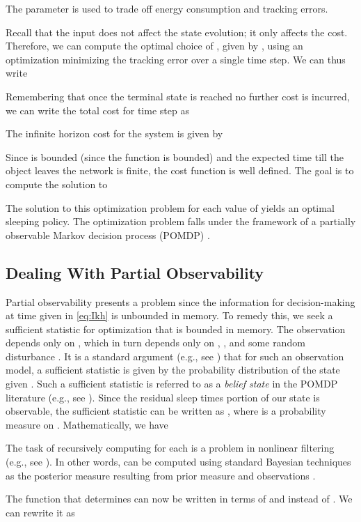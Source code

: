 \documentclass[journal,draftcls,onecolumn,11pt]{IEEEtran}
\begin{document}
The parameter  is used to trade off energy consumption and tracking errors.

Recall that the input  does not affect the state evolution; it only affects the cost. Therefore, we can compute the optimal choice of , given by , using an optimization minimizing the tracking error over a single time step.  We can thus write


Remembering that once the terminal state is reached no further cost is incurred, we can write the total cost for time step  as

The infinite horizon cost for the system is given by

Since  is bounded (since the function  is bounded) and the expected time till the object leaves the network is finite, the cost function  is well defined.  The goal is to compute the solution to

The solution to this optimization problem for each value of  yields an optimal sleeping policy.  The optimization problem falls under the framework of a partially observable Markov decision process (POMDP) \cite{aberdeen03,littman95,monahan,Hauskrecht2000}.

\subsection{Dealing With Partial Observability}
Partial observability presents a problem since the information for decision-making at time  given in \eqref{eq:Ikh} is unbounded in memory.  To remedy this, we seek a sufficient statistic for optimization that is bounded in memory.  The observation  depends only on , which in turn depends only on , , and some random disturbance .  It is a standard argument (e.g., see \cite{bertsekas07}) that for such an observation model, a sufficient statistic is given by the probability distribution of the state  given .  Such a sufficient statistic is referred to as a {\em belief state} in the POMDP literature (e.g., see \cite{aberdeen03,littman95}).  Since the residual sleep times portion of our state is observable, the sufficient statistic can be written as , where  is a probability measure on .  Mathematically, we have

The task of recursively computing  for each  is a problem in nonlinear filtering (e.g., see \cite{doucet01}).  In other words,  can be computed using standard Bayesian techniques as the posterior measure resulting from prior measure  and observations .

The function  that determines  can now be written in terms of  and  instead of .  We can rewrite it as
\end{document}
